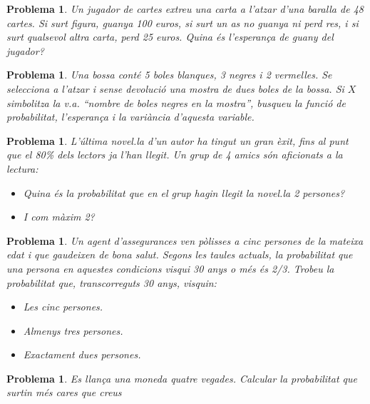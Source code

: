 \documentclass[11pt]{article}
\newcounter{prbcont}
\newtheorem{problema}[prbcont]{Problema}
\newcommand{\sol}[1]{{\textbf{\footnotetext[\the\problemes]{Sol.: #1} }}}
\begin{document}
\begin{problema}
Un jugador de cartes extreu una carta a l'atzar d'una baralla de 48 cartes. Si surt
figura, guanya 100 euros, si surt un as no guanya ni perd res, i si surt qualsevol altra
carta, perd 25 euros. Quina \'es l'esperan\c{c}a de guany del jugador? %
\end{problema}

\begin{problema}
Una bossa cont\'e 5 boles blanques, 3 negres i 2 vermelles. Se selecciona a l'atzar i
sense devoluci\'o una mostra de dues boles de la bossa. Si $X$ simbolitza la v.a. ``nombre
de boles negres en la mostra'', busqueu la funci\'o de probabilitat, l'esperan\c{c}a i la vari\`ancia
d'aquesta variable. 
\end{problema}



\begin{problema}
L'\'ultima novel.la d'un autor ha tingut un gran \`exit, fins al punt que el 80\% dels lectors ja l'han llegit. Un grup de 4 amics s\'on aficionats a la lectura: 
\begin{itemize}
\item Quina \'es la probabilitat que en el grup hagin llegit la novel.la 2 persones? 
\item I com m\`axim 2? 
\end{itemize}
\end{problema}

\begin{problema}
Un agent d'assegurances ven p\`olisses a cinc persones de la mateixa edat i que gaudeixen de bona salut. Segons les taules actuals, la probabilitat que una persona en aquestes condicions visqui 30 anys o m\'es \'es 2/3. Trobeu la probabilitat que, transcorreguts 30 anys, visquin: 
\begin{itemize}
\item Les cinc persones. 
\item Almenys tres persones. 
\item Exactament dues persones. 
\end{itemize}
\end{problema}

\begin{problema}
Es llan\c{c}a una moneda quatre vegades. Calcular la probabilitat que surtin m\'es cares que creus 
\end{problema}
\end{document}
